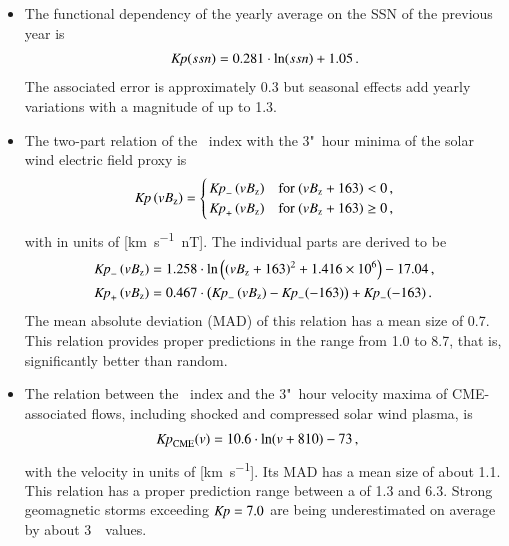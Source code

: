 \begin{itemize}
	\item The functional dependency of the yearly \Kp{} average on the SSN of the previous year is
	\begin{align*}
		\textit{Kp}(ssn) = 0.281 \cdot \ln(ssn) + 1.05	\,.
	\end{align*}
	The associated \Kp{} error is approximately \num{0.3} but seasonal effects add yearly variations with a \Kp{} magnitude of up to 1.3.

	\item The two-part relation of the \Kp~index with the 3"~hour minima of the solar wind electric field proxy \vBz{} is
	\begin{align*}
		\text{\textit{Kp}}\left(vB_\text{z}\right) =
		\begin{cases}
			\,\text{\textit{Kp}}_-\left(vB_\text{z}\right) &\text{for~} (vB_\text{z} + 163) < 0	\,,\\
			\,\text{\textit{Kp}}_+\left(vB_\text{z}\right) &\text{for~} (vB_\text{z} + 163) \ge 0	\,,
		\end{cases}
	\end{align*}
	with \vBz{} in units of [\si{\km\per\s \nano\tesla}]. The individual parts are derived to be
	\begin{align*}
		\text{\textit{Kp}}_-\left(vB_\text{z}\right) &= 1.258 \cdot \ln\left(\left(vB_\text{z} + 163\right)^2 + \num{1.416e6}\right) - 17.04	\,,\\
		\text{\textit{Kp}}_+\left(vB_\text{z}\right) &= 0.467 \cdot \left(\text{\textit{Kp}}_-\left(vB_\text{z}\right) - \text{\textit{Kp}}_-(-163)\right) + \text{\textit{Kp}}_-(-163)	\,.
	\end{align*}
	The mean absolute deviation (MAD) of this relation has a mean \Kp{} size of \num{0.7}. This relation provides proper predictions in the \Kp{} range from \num{1.0} to \num{8.7}, that is, significantly better than random.

	\item The relation between the \Kp~index and the 3"~hour velocity maxima of CME-associated flows, including shocked and compressed solar wind plasma, is
	\begin{align*}
		\text{\textit{Kp}}_\text{CME}(v) &= 10.6 \cdot \ln(v + 810) - 73	\,,
	\end{align*}
	with the velocity in units of [\si{\km\per\s}]. Its MAD has a mean \Kp{} size of about \num{1.1}. This relation has a proper prediction range between a \Kp{} of \num{1.3} and \num{6.3}. Strong geomagnetic storms exceeding $\text{\textit{Kp}} = 7.0$ are being underestimated on average by about 3~\Kp~values.


\end{itemize}
